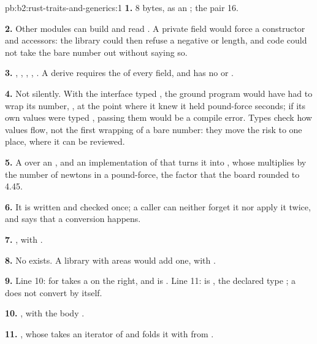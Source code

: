 \begin{solution}{pb:b2:rust-traits-and-generics:1}
\textbf{1.} 8 bytes, as an ; the pair 16.

\textbf{2.} Other modules can build  and read . A private field would force a
constructor and accessors: the library could then refuse a negative or  length, and code could not take the
bare number out without saying so.

\textbf{3.} , , , , . A derive requires the
 of every field, and  has no  or .

\textbf{4.} Not silently. With the interface typed , the ground program would have had to wrap
its number, , at the point where it knew it held pound-force seconds; if its own values were
typed , passing them would be a compile error. Types check how values flow, not the first
wrapping of a bare number: they move the risk to one place, where it can be reviewed.

\textbf{5.} A   over an , and an implementation of  that
turns it into , whose  multiplies by the number of newtons in a pound-force, the factor that the board rounded to 4.45.

\textbf{6.} It is written and checked once; a caller can neither forget it nor apply it twice, and 
says that a conversion happens.

\textbf{7.} , with .

\textbf{8.} No  exists. A library with areas would add one, with .

\textbf{9.} Line 10:  for  takes a  on the right, and  is
. Line 11:  is , the declared type ; a  does not convert by
itself.

\textbf{10.} , with the body
.

\textbf{11.} , whose  takes an iterator of  and folds
it with \code{+} from .


\end{solution}
